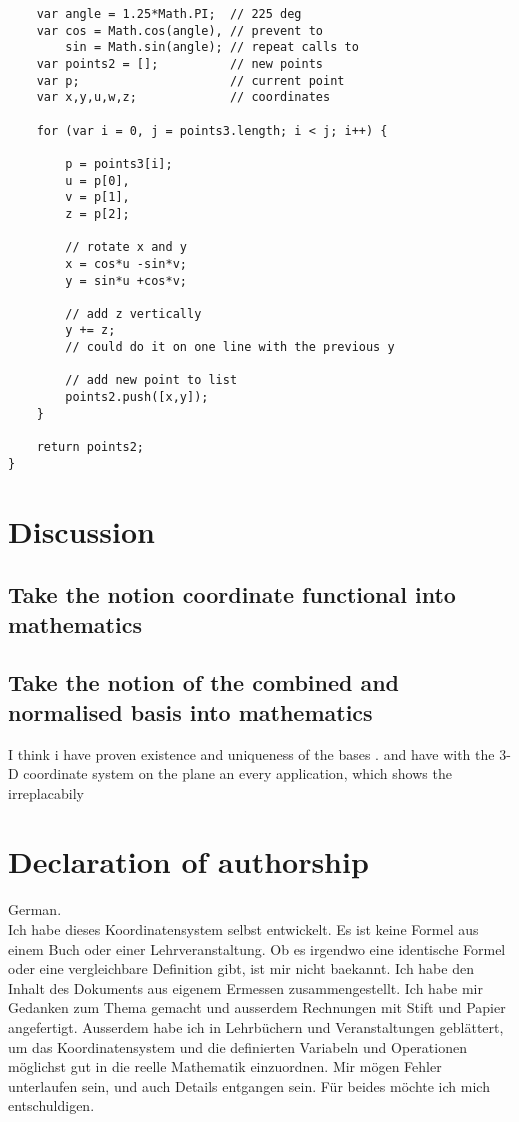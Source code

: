 \documentclass[a4paper]{article}
\begin{document}
\begin{PropositionOpt4}
\begin{example}
\begin{lstlisting}
    var angle = 1.25*Math.PI;  // 225 deg
    var cos = Math.cos(angle), // prevent to
        sin = Math.sin(angle); // repeat calls to
    var points2 = [];          // new points
    var p;                     // current point
    var x,y,u,w,z;             // coordinates
    
    for (var i = 0, j = points3.length; i < j; i++) {

        p = points3[i];
        u = p[0], 
        v = p[1], 
        z = p[2];

        // rotate x and y 
        x = cos*u -sin*v; 
        y = sin*u +cos*v; 
    
        // add z vertically
        y += z; 
        // could do it on one line with the previous y

        // add new point to list
        points2.push([x,y]);
    }

    return points2;
}
\end{lstlisting}
\end{example}

 
\section{Discussion}

\subsection{Take the notion coordinate functional into mathematics}
\subsection{Take the notion of the combined and normalised basis into mathematics}

I think i have proven existence and uniqueness of the bases . and have with the 3-D coordinate system on the plane an every application, which shows the irreplacabily


\section{Declaration of authorship}

German.\\ 

Ich habe dieses Koordinatensystem selbst entwickelt. Es ist keine Formel aus einem Buch oder einer Lehrveranstaltung.
Ob es irgendwo eine identische Formel oder eine vergleichbare Definition gibt, ist mir nicht baekannt.
Ich habe den Inhalt des Dokuments aus eigenem Ermessen zusammengestellt. Ich habe mir Gedanken zum Thema gemacht und
ausserdem Rechnungen mit Stift und Papier angefertigt. Ausserdem habe ich in Lehrb\"uchern und Veranstaltungen gebl\"attert,
um das Koordinatensystem und die definierten Variabeln und Operationen m\"oglichst gut in die reelle Mathematik einzuordnen.
Mir m\"ogen Fehler unterlaufen sein, und auch Details entgangen sein. F\"ur beides m\"ochte ich mich entschuldigen.\\


\end{PropositionOpt4}
\end{document}

